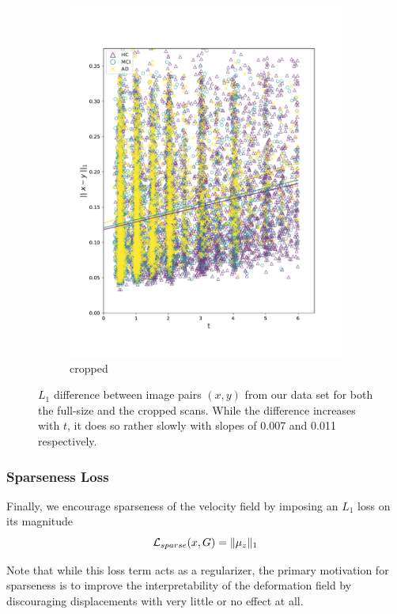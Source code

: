 \begin{figure}[h]
\begin{subfigure}{0.48\textwidth}
		\includegraphics[width=\linewidth, trim={10 30 30 30}, clip]{images/l1_diff_plots/slice.pdf}
		\caption{cropped}
	\end{subfigure}
	 
	\caption{$L_1$ difference between image pairs $(x, y)$ from our data set for both the full-size and the cropped scans. While the difference increases with $t$, it does so rather slowly with slopes of 0.007 and 0.011 respectively.}
	\label{fig:l1plots}
\end{figure}

\subsubsection*{Sparseness Loss}
Finally, we encourage sparseness of the velocity field by imposing an $L_1$ loss on its magnitude
\begin{equation}
	\mathcal{L}_{sparse}( x, G ) = \lVert\mu_z\rVert_1
\end{equation}

Note that while this loss term acts as a regularizer, the primary motivation for sparseness is to improve the interpretability of the deformation field by discouraging displacements with very little or no effect at all.

